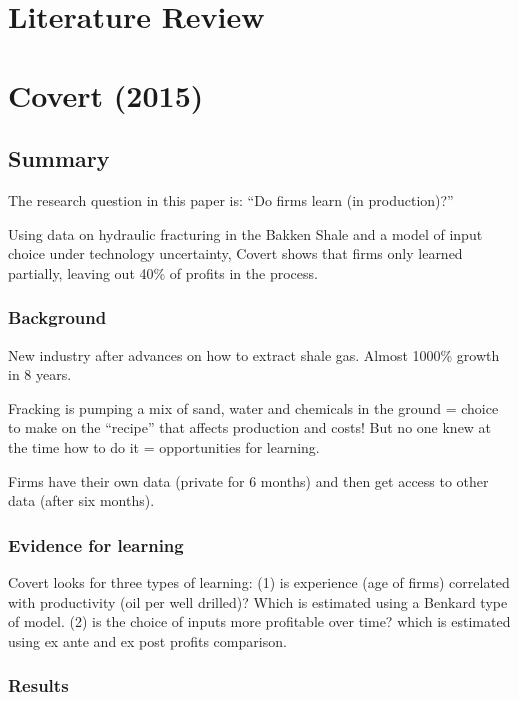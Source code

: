\section{Literature Review}



\section{Covert (2015)}

\subsection{Summary}

The research question in this paper is: ``Do firms learn (in production)?''

Using data on hydraulic fracturing in the Bakken Shale and a model of input choice under technology uncertainty, Covert shows that firms only learned partially, leaving out 40\% of profits in the process.

\subsubsection{Background}

New industry after advances on how to extract shale gas. Almost 1000\% growth in 8 years.

Fracking is pumping a mix of sand, water and chemicals in the ground = choice to make on the ``recipe'' that affects production and costs! But no one knew at the time how to do it = opportunities for learning.

Firms have their own data (private for 6 months) and then get access to other data (after six months).

\subsubsection{Evidence for learning}

Covert looks for three types of learning: (1) is experience (age of firms) correlated with productivity (oil per well drilled)? Which is estimated using a Benkard type of model. (2) is the choice of inputs more profitable over time? which is estimated using ex ante and ex post profits comparison.

\subsubsection{Results}

